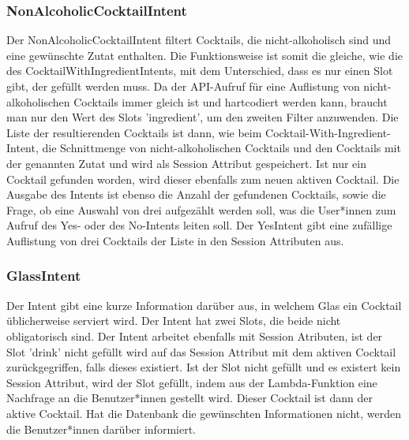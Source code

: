 \documentclass[12pt,letterpaper]{article}
\begin{document}
\subsubsection{NonAlcoholicCocktailIntent}
Der NonAlcoholicCocktailIntent filtert Cocktails, die nicht-alkoholisch sind und eine gewünschte Zutat enthalten. Die Funktionsweise ist somit die gleiche, wie die des CocktailWithIngredientIntents, mit dem Unterschied, dass es nur einen Slot gibt, der gefüllt werden muss. Da der API-Aufruf für eine Auflistung von nicht-alkoholischen Cocktails immer gleich ist und hartcodiert werden kann, braucht man nur den Wert des Slots 'ingredient', um den zweiten Filter anzuwenden. Die Liste der resultierenden Cocktails ist dann, wie beim Cocktail-With-Ingredient-Intent, die Schnittmenge von nicht-alkoholischen Cocktails und den Cocktails mit der genannten Zutat und wird als Session Attribut gespeichert. Ist nur ein Cocktail gefunden worden, wird dieser ebenfalls zum neuen aktiven Cocktail. Die Ausgabe des Intents ist ebenso die Anzahl der gefundenen Cocktails, sowie die Frage, ob eine Auswahl von drei aufgezählt werden soll, was die User*innen zum Aufruf des Yes- oder des No-Intents leiten soll. Der YesIntent gibt eine zufällige Auflistung von drei Cocktails der Liste in den Session Attributen aus. \\


\subsubsection{GlassIntent}
Der Intent gibt eine kurze Information darüber aus, in welchem Glas ein Cocktail üblicherweise serviert wird. Der Intent hat zwei Slots, die beide nicht obligatorisch sind. Der Intent arbeitet ebenfalls mit Session Atributen, ist der Slot 'drink' nicht gefüllt wird auf das Session Attribut mit dem aktiven Cocktail zurückgegriffen, falls dieses existiert. Ist der Slot nicht gefüllt und es existert kein Session Attribut, wird der Slot gefüllt, indem aus der Lambda-Funktion eine Nachfrage an die Benutzer*innen gestellt wird. Dieser Cocktail ist dann der aktive Cocktail. Hat die Datenbank die gewünschten Informationen nicht, werden die Benutzer*innen darüber informiert. \\

\end{document}
